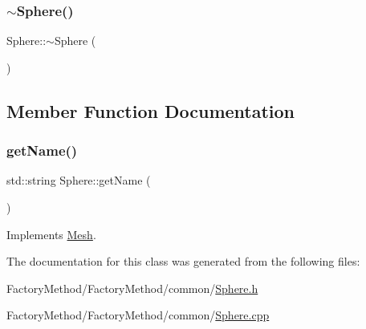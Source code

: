 \subsubsection{\texorpdfstring{$\sim$Sphere()}{~Sphere()}}
{\footnotesize\ttfamily Sphere\+::$\sim$\+Sphere (\begin{DoxyParamCaption}{ }\end{DoxyParamCaption})}



\subsection{Member Function Documentation}
\mbox{\label{class_sphere_a173e667086ecd8b9d972e1d6f9885d9d}} 
\subsubsection{\texorpdfstring{getName()}{getName()}}
{\footnotesize\ttfamily std\+::string Sphere\+::get\+Name (\begin{DoxyParamCaption}{ }\end{DoxyParamCaption})\hspace{0.3cm}{\ttfamily [virtual]}}



Implements \mbox{\hyperlink{class_mesh_aa131fe1c2586fe60988155db77c57272}{Mesh}}.



The documentation for this class was generated from the following files\+:\begin{DoxyCompactItemize}
\item 
Factory\+Method/\+Factory\+Method/common/\mbox{\hyperlink{_sphere_8h}{Sphere.\+h}}\item 
Factory\+Method/\+Factory\+Method/common/\mbox{\hyperlink{_sphere_8cpp}{Sphere.\+cpp}}\end{DoxyCompactItemize}
